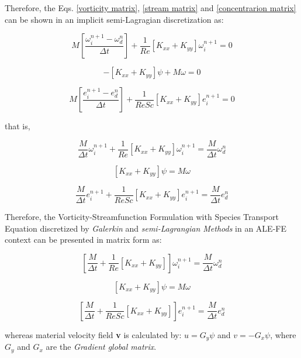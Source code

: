 \medskip
Therefore, the Eqs. 
\ref{vorticity matrix},
\ref{stream matrix} and
\ref{concentrarion matrix} 
can be shown 
in an
implicit semi-Lagragian 
discretization as:

\begin{equation}
 M \left[ \frac{\omega^{n+1}_{i} - \omega^{n}_{d}}{\Delta t} \right] 
 + \frac{1}{\textit{Re}} \left[ K_{xx} + K_{yy} \right] \omega^{n+1}_{i}
 = 0
\end{equation}

\begin{equation}
 - \left[ K_{xx} + K_{yy} \right] \psi + M \omega = 0
\end{equation}

\begin{equation}
 M \left[ \frac{e^{n+1}_{i} - e^{n}_{d}}{\Delta t} \right]
 + \frac{1}{\textit{ReSc}} \left[ K_{xx} + K_{yy} \right] e^{n+1}_{i}
 = 0
\end{equation}


\medskip
\noindent
that is,

\begin{equation}
 \frac{M}{\Delta t} \omega^{n+1}_{i}
 + \frac{1}{\textit{Re}} \left[ K_{xx} + K_{yy} \right] \omega^{n+1}_{i}
 = \frac{M}{\Delta t} \omega^{n}_{d}
\end{equation}

\begin{equation}
 \left[ K_{xx} + K_{yy} \right] \psi 
 =  M \omega
\end{equation}

\begin{equation}
 \frac{M}{\Delta t} e^{n+1}_{i}
 + \frac{1}{\textit{ReSc}} \left[ K_{xx} + K_{yy} \right] e^{n+1}_{i}
 = \frac{M}{\Delta t} e^{n}_{d}
\end{equation}


\medskip
Therefore, the Vorticity-Streamfunction Formulation with
Species Transport Equation discretized by \textit{Galerkin}
and \textit{semi-Lagrangian Methods} in an ALE-FE context
can be presented in matrix form as:

\begin{equation}
 \left[
 \frac{M}{\Delta t} 
 + \frac{1}{\textit{Re}} \left[ K_{xx} + K_{yy} \right]
 \right] 
 \omega^{n+1}_{i}
 = \frac{M}{\Delta t} \omega^{n}_{d}
\end{equation}

\begin{equation}
 \left[ K_{xx} + K_{yy} \right] \psi 
 =  M \omega
\end{equation}

\begin{equation}
 \left[
 \frac{M}{\Delta t} 
 + \frac{1}{\textit{ReSc}} \left[ K_{xx} + K_{yy} \right]
 \right] 
 e^{n+1}_{i}
 = \frac{M}{\Delta t} e^{n}_{d}
\end{equation}

\medskip
\noindent
whereas material velocity field \textbf{v} is calculated by:
$u =   G_{y} \psi$ and 
$v = - G_{x} \psi$, 
where 
$G_{y}$ and 
$G_{x}$ are the \textit{Gradient global matrix}.
 

